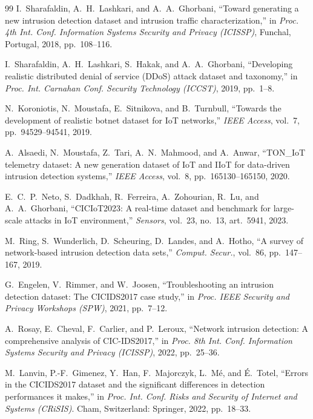 \documentclass[11pt,a4paper]{article}
\begin{document}
\begin{thebibliography}{99}
 I.~Sharafaldin, A.~H.~Lashkari, and A.~A.~Ghorbani, ``Toward
generating a new intrusion detection dataset and intrusion traffic
characterization,'' in \emph{Proc. 4th Int. Conf. Information Systems Security
and Privacy (ICISSP)}, Funchal, Portugal, 2018, pp.~108--116.

 I.~Sharafaldin, A.~H.~Lashkari, S.~Hakak, and A.~A.~Ghorbani,
``Developing realistic distributed denial of service (DDoS) attack dataset and
taxonomy,'' in \emph{Proc. Int. Carnahan Conf. Security Technology (ICCST)},
2019, pp.~1--8.

 N.~Koroniotis, N.~Moustafa, E.~Sitnikova, and B.~Turnbull,
``Towards the development of realistic botnet dataset for IoT networks,''
\emph{IEEE Access}, vol.~7, pp.~94529--94541, 2019.

 A.~Alsaedi, N.~Moustafa, Z.~Tari, A.~N.~Mahmood, and A.~Anwar,
``TON\_IoT telemetry dataset: A new generation dataset of IoT and IIoT for
data-driven intrusion detection systems,'' \emph{IEEE Access}, vol.~8,
pp.~165130--165150, 2020.

 E.~C.~P.~Neto, S.~Dadkhah, R.~Ferreira, A.~Zohourian, R.~Lu,
and A.~A.~Ghorbani, ``CICIoT2023: A real-time dataset and benchmark for
large-scale attacks in IoT environment,'' \emph{Sensors}, vol.~23, no.~13,
art.~5941, 2023.

 M.~Ring, S.~Wunderlich, D.~Scheuring, D.~Landes, and A.~Hotho,
``A survey of network-based intrusion detection data sets,'' \emph{Comput.
Secur.}, vol.~86, pp.~147--167, 2019.

 G.~Engelen, V.~Rimmer, and W.~Joosen, ``Troubleshooting an
intrusion detection dataset: The CICIDS2017 case study,'' in \emph{Proc. IEEE
Security and Privacy Workshops (SPW)}, 2021, pp.~7--12.

 A.~Rosay, E.~Cheval, F.~Carlier, and P.~Leroux, ``Network
intrusion detection: A comprehensive analysis of CIC-IDS2017,'' in \emph{Proc.
8th Int. Conf. Information Systems Security and Privacy (ICISSP)}, 2022,
pp.~25--36.

 M.~Lanvin, P.-F.~Gimenez, Y.~Han, F.~Majorczyk, L.~M\'e, and
\'E.~Totel, ``Errors in the CICIDS2017 dataset and the significant differences
in detection performances it makes,'' in \emph{Proc. Int. Conf. Risks and
Security of Internet and Systems (CRiSIS)}. Cham, Switzerland: Springer, 2022,
pp.~18--33.


\end{thebibliography}
\end{document}
